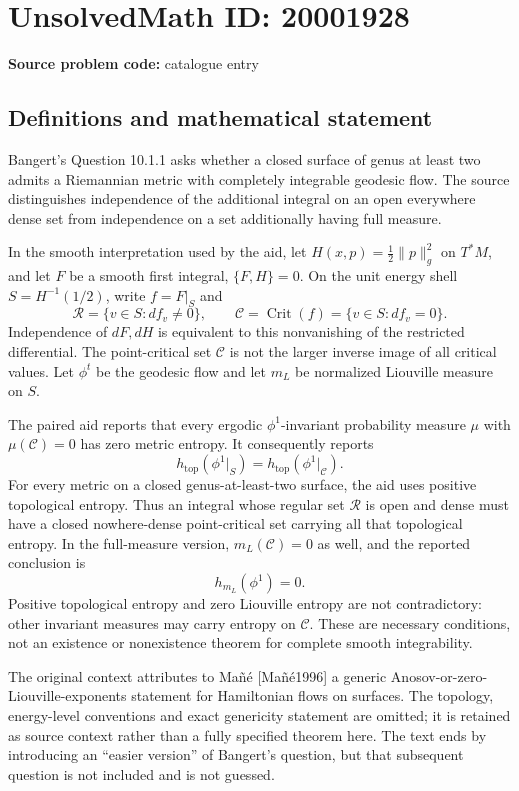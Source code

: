 \documentclass[11pt]{article}
\begin{document}
\section*{UnsolvedMath ID: 20001928}
\textbf{Source problem code:} catalogue entry
\subsection{Definitions and mathematical statement}
Bangert's Question 10.1.1 asks whether a closed surface of genus at least two admits a Riemannian metric with completely integrable geodesic flow. The source distinguishes independence of the additional integral on an open everywhere dense set from independence on a set additionally having full measure.

In the smooth interpretation used by the aid, let \(H(x,p)=\tfrac12\|p\|_g^2\) on \(T^*M\), and let \(F\) be a smooth first integral, \(\{F,H\}=0\). On the unit energy shell \(S=H^{-1}(1/2)\), write \(f=F|_S\) and
\[
 \mathcal R=\{v\in S:df_v\ne0\},\qquad
 \mathcal C=\operatorname{Crit}(f)=\{v\in S:df_v=0\}.
\]
Independence of \(dF,dH\) is equivalent to this nonvanishing of the restricted differential. The point-critical set \(\mathcal C\) is not the larger inverse image of all critical values. Let \(\phi^t\) be the geodesic flow and let \(m_L\) be normalized Liouville measure on \(S\).

The paired aid reports that every ergodic \(\phi^1\)-invariant probability measure \(\mu\) with \(\mu(\mathcal C)=0\) has zero metric entropy. It consequently reports
\[
 h_{\mathrm{top}}(\phi^1|_S)=
 h_{\mathrm{top}}(\phi^1|_{\mathcal C}).
\]
For every metric on a closed genus-at-least-two surface, the aid uses positive topological entropy. Thus an integral whose regular set \(\mathcal R\) is open and dense must have a closed nowhere-dense point-critical set carrying all that topological entropy. In the full-measure version, \(m_L(\mathcal C)=0\) as well, and the reported conclusion is
\[
 h_{m_L}(\phi^1)=0.
\]
Positive topological entropy and zero Liouville entropy are not contradictory: other invariant measures may carry entropy on \(\mathcal C\). These are necessary conditions, not an existence or nonexistence theorem for complete smooth integrability.

The original context attributes to Ma\~n\'e [Ma\~n\'e1996] a generic Anosov-or-zero-Liouville-exponents statement for Hamiltonian flows on surfaces. The topology, energy-level conventions and exact genericity statement are omitted; it is retained as source context rather than a fully specified theorem here. The text ends by introducing an ``easier version'' of Bangert's question, but that subsequent question is not included and is not guessed.
\end{document}
